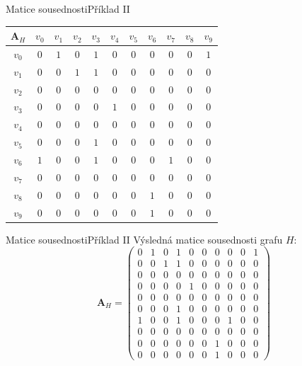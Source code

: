 \documentclass[11pt,professionalfont,aspectratio=43]{beamer}
\begin{document}
    \begin{frame}{Matice sousednosti}{Příklad \textrm{II}}
        \begin{table}
            \centering
            \begin{tabular}{c|cccccccccc}
                $\mathbf{A}_H$ & $v_0$ & $v_1$ & $v_2$ & $v_3$ & $v_4$ & $v_5$ & $v_6$ & $v_7$ & $v_8$ & $v_9$ \\ \hline
                $v_0$ & $0$ & $1$ & $0$ & $1$ & $0$ & $0$ & $0$ & $0$ & $0$ & $1$ \\
                $v_1$ & $0$ & $0$ & $1$ & $1$ & $0$ & $0$ & $0$ & $0$ & $0$ & $0$ \\
                $v_2$ & $0$ & $0$ & $0$ & $0$ & $0$ & $0$ & $0$ & $0$ & $0$ & $0$ \\
                $v_3$ & $0$ & $0$ & $0$ & $0$ & $1$ & $0$ & $0$ & $0$ & $0$ & $0$ \\
                $v_4$ & $0$ & $0$ & $0$ & $0$ & $0$ & $0$ & $0$ & $0$ & $0$ & $0$ \\
                $v_5$ & $0$ & $0$ & $0$ & $1$ & $0$ & $0$ & $0$ & $0$ & $0$ & $0$ \\
                $v_6$ & $1$ & $0$ & $0$ & $1$ & $0$ & $0$ & $0$ & $1$ & $0$ & $0$ \\
                $v_7$ & $0$ & $0$ & $0$ & $0$ & $0$ & $0$ & $0$ & $0$ & $0$ & $0$ \\
                $v_8$ & $0$ & $0$ & $0$ & $0$ & $0$ & $0$ & $1$ & $0$ & $0$ & $0$ \\
                $v_9$ & $0$ & $0$ & $0$ & $0$ & $0$ & $0$ & $1$ & $0$ & $0$ & $0$
            \end{tabular}
        \end{table}
    \end{frame}

    \begin{frame}{Matice sousednosti}{Příklad \textrm{II}}
        Výsledná matice sousednosti grafu $H$:
        \[\mathbf{A}_H=\left(\begin{matrix}
            0 & 1 & 0 & 1 & 0 & 0 & 0 & 0 & 0 & 1 \\
            0 & 0 & 1 & 1 & 0 & 0 & 0 & 0 & 0 & 0 \\
            0 & 0 & 0 & 0 & 0 & 0 & 0 & 0 & 0 & 0 \\
            0 & 0 & 0 & 0 & 1 & 0 & 0 & 0 & 0 & 0 \\
            0 & 0 & 0 & 0 & 0 & 0 & 0 & 0 & 0 & 0 \\
            0 & 0 & 0 & 1 & 0 & 0 & 0 & 0 & 0 & 0 \\
            1 & 0 & 0 & 1 & 0 & 0 & 0 & 1 & 0 & 0 \\
            0 & 0 & 0 & 0 & 0 & 0 & 0 & 0 & 0 & 0 \\
            0 & 0 & 0 & 0 & 0 & 0 & 1 & 0 & 0 & 0 \\
            0 & 0 & 0 & 0 & 0 & 0 & 1 & 0 & 0 & 0
        \end{matrix}\right)\]
    \end{frame}
\end{document}
